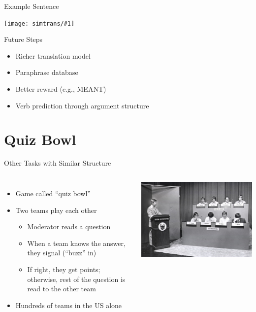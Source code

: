 \documentclass[compress]{beamer}
\newcommand{\gfxs}[2]{
\begin{center}
	\texttt{[image: simtrans/\#1]}
\end{center}
}
\begin{document}
\begin{frame}{Example Sentence}

  \gfxs{ex_imperfect}{.7}

\end{frame}

\begin{frame}{Future Steps}

  \begin{itemize}
    \item Richer translation model
    \item Paraphrase database
    \item Better reward (e.g., MEANT)
    \item Verb prediction through argument structure
  \end{itemize}

\end{frame}

\section{Quiz Bowl}

\begin{frame}{Other Tasks with Similar Structure}
	\begin{columns}

	\begin{itemize}
		\item Game called ``quiz bowl''
		\item Two teams play each other
		\begin{itemize}
			\item Moderator reads a question
			\item When a team knows the answer, they signal (``buzz'' in)
			\item If right, they get points; otherwise, rest of the question is read to the other team
		\end{itemize}
		\item Hundreds of teams in the US alone
	\end{itemize}

	\includegraphics{qb/quizbowl}

	\end{columns}

\end{frame}
\end{document}
